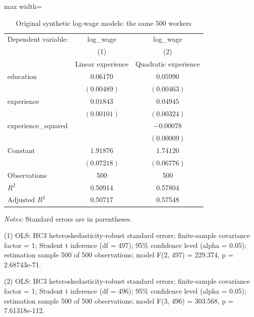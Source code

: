 \begin{table}[htbp]
\centering
\caption{Original synthetic log-wage models: the same 500 workers}
\begingroup
\small
\setlength{\tabcolsep}{6pt}
\renewcommand{\arraystretch}{1.12}
\begin{adjustbox}{max width=\linewidth}
\begin{tabular}{@{}lcc@{}}
\toprule
Dependent variable: & log\_wage & log\_wage \\
 & (1) & (2) \\
 & Linear experience & Quadratic experience \\
\midrule
education & $0.06170$ & $0.05990$ \\
 & $(0.00489)$ & $(0.00463)$ \\[0.35em]
experience & $0.01843$ & $0.04945$ \\
 & $(0.00101)$ & $(0.00324)$ \\[0.35em]
experience\_squared &  & $-0.00078$ \\
 &  & $(0.00009)$ \\[0.35em]
Constant & $1.91876$ & $1.74120$ \\
 & $(0.07218)$ & $(0.06776)$ \\[0.35em]
\midrule
Observations & 500 & 500 \\
$R^{2}$ & 0.50914 & 0.57804 \\
$\text{Adjusted }R^{2}$ & 0.50717 & 0.57548 \\
\bottomrule
\end{tabular}
\end{adjustbox}
\par\smallskip
\begin{minipage}{\linewidth}
\footnotesize
\raggedright
\textit{Notes:} Standard errors are in parentheses.\par
(1) OLS: HC3 heteroskedasticity-robust standard errors; finite-sample covariance factor = 1; Student t inference (df = 497); 95\% confidence level (alpha = 0.05); estimation sample 500 of 500 observations; model F(2, 497) = 229.374, p = 2.68743e-71.\par
(2) OLS: HC3 heteroskedasticity-robust standard errors; finite-sample covariance factor = 1; Student t inference (df = 496); 95\% confidence level (alpha = 0.05); estimation sample 500 of 500 observations; model F(3, 496) = 303.568, p = 7.61318e-112.\par
\end{minipage}
\endgroup
\end{table}